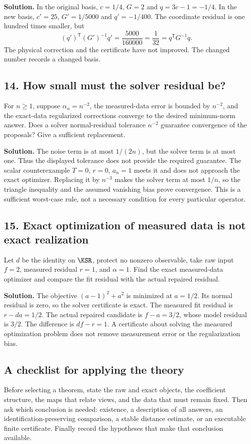 \documentclass[11pt,oneside,openany]{book}
\numberwithin{equation}{section}
\begin{document}
\textbf{Solution.} In the original basis, $c=1/4$, $G=2$ and $q=3c-1=-1/4$. In the new basis, $c'=25$, $G'=1/5000$ and $q'=-1/400$. The coordinate residual is one hundred times smaller, but
\[
 (q')^{\mathsf T}(G')^{-1}q'=\frac{5000}{160000}=\frac1{32}
 =q^{\mathsf T}G^{-1}q.
\]
The physical correction and the certificate have not improved. The changed number records a changed basis.

\subsection*{14. How small must the solver residual be?}
For $n\ge1$, suppose $\alpha_n=n^{-2}$, the measured-data error is bounded by $n^{-2}$, and the exact-data regularized corrections converge to the desired minimum-norm answer. Does a solver normal-residual tolerance $n^{-2}$ guarantee convergence of the proposals? Give a sufficient replacement.

\textbf{Solution.} The noise term is at most $1/(2n)$, but the solver term is at most one. Thus the displayed tolerance does not provide the required guarantee. The scalar counterexample $T=0$, $r=0$, $a_n=1$ meets it and does not approach the exact optimizer. Replacing it by $n^{-3}$ makes the solver term at most $1/n$, so the triangle inequality and the assumed vanishing bias prove convergence. This is a sufficient worst-case rule, not a necessary condition for every particular operator.

\subsection*{15. Exact optimization of measured data is not exact realization}
Let $d$ be the identity on $\KSR$, protect no nonzero observable, take raw input $f=2$, measured residual $r=1$, and $\alpha=1$. Find the exact measured-data optimizer and compare the fit residual with the actual repaired residual.

\textbf{Solution.} The objective $(a-1)^2+a^2$ is minimized at $a=1/2$. Its normal residual is zero, so the solver certificate is exact. The measured fit residual is $r-da=1/2$. The actual repaired candidate is $f-a=3/2$, whose model residual is $3/2$. The difference is $df-r=1$. A certificate about solving the measured optimization problem does not remove measurement error or the regularization bias.

\subsection*{A checklist for applying the theory}
Before selecting a theorem, state the raw and exact objects, the coefficient structure, the maps that relate views, and the data that must remain fixed. Then ask which conclusion is needed: existence, a description of all answers, an identification-preserving comparison, a stable distance estimate, or an executable finite certificate. Finally record the hypotheses that make that conclusion available.
\end{document}
